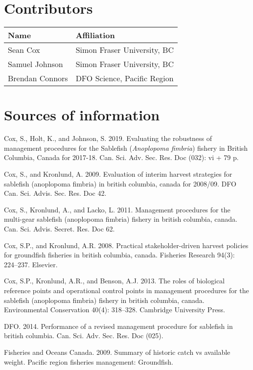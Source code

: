 \documentclass[11pt]{book}
\begin{document}
\hypertarget{contributors}{%
\section{Contributors}\label{contributors}}
\begin{longtable}[]{@{}ll@{}}
\toprule
Name & Affiliation\tabularnewline
\midrule
\endhead
Sean Cox & Simon Fraser University, BC\tabularnewline
Samuel Johnson & Simon Fraser University, BC\tabularnewline
Brendan Connors & DFO Science, Pacific Region\tabularnewline
\bottomrule
\end{longtable}
\MakeApproval

\hypertarget{sources-of-information}{%
\section{Sources of information}\label{sources-of-information}}

\hypertarget{refs}{}
\leavevmode\hypertarget{ref-cox2019evaluating}{}%
Cox, S., Holt, K., and Johnson, S. 2019. Evaluating the robustness of management procedures for the Sablefish (\emph{Anoplopoma fimbria}) fishery in British Columbia, Canada for 2017-18. Can. Sci. Adv. Sec. Res. Doc (032): vi + 79 p.

\leavevmode\hypertarget{ref-cox2009evaluation}{}%
Cox, S., and Kronlund, A. 2009. Evaluation of interim harvest strategies for sablefish (anoplopoma fimbria) in british columbia, canada for 2008/09. DFO Can. Sci. Advis. Sec. Res. Doc 42.

\leavevmode\hypertarget{ref-cox2011management}{}%
Cox, S., Kronlund, A., and Lacko, L. 2011. Management procedures for the multi-gear sablefish (anoplopoma fimbria) fishery in british columbia, canada. Can. Sci. Advis. Secret. Res. Doc 62.

\leavevmode\hypertarget{ref-cox2008practical}{}%
Cox, S.P., and Kronlund, A.R. 2008. Practical stakeholder-driven harvest policies for groundfish fisheries in british columbia, canada. Fisheries Research 94(3): 224--237. Elsevier.

\leavevmode\hypertarget{ref-cox2013roles}{}%
Cox, S.P., Kronlund, A.R., and Benson, A.J. 2013. The roles of biological reference points and operational control points in management procedures for the sablefish (anoplopoma fimbria) fishery in british columbia, canada. Environmental Conservation 40(4): 318--328. Cambridge University Press.

\leavevmode\hypertarget{ref-dfo2014performanc}{}%
DFO. 2014. Performance of a revised management procedure for sablefish in british columbia. Can. Sci. Adv. Sec. Res. Doc (025).

\leavevmode\hypertarget{ref-DFO2009}{}%
Fisheries and Oceans Canada. 2009. Summary of historic catch vs available weight. Pacific region fisheries management: Groundfish.

\MakeAvailable
\end{document}
